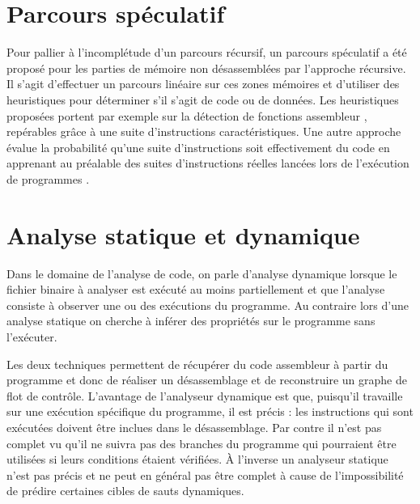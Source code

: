 \section{Parcours spéculatif}
Pour pallier à l'incomplétude d'un parcours récursif, un parcours spéculatif a été proposé pour les parties de mémoire non désassemblées par l'approche récursive. 
Il s'agit d'effectuer un parcours linéaire sur ces zones mémoires et d'utiliser des heuristiques pour déterminer s'il s'agit de code ou de données.
Les heuristiques proposées portent par exemple sur la détection de fonctions assembleur \cite{KruegelRVV04}, repérables grâce à une suite d'instructions caractéristiques. Une autre approche évalue la probabilité qu'une suite d'instructions soit effectivement du code en apprenant au préalable des suites d'instructions réelles lancées lors de l'exécution de programmes \cite{KDF09}.




\section{Analyse statique et dynamique}
Dans le domaine de l'analyse de code, on parle d'analyse dynamique lorsque le fichier binaire à analyser est exécuté au moins partiellement et que l'analyse consiste à observer une ou des exécutions du programme. Au contraire lors d'une analyse statique on cherche à inférer des propriétés sur le programme sans l'exécuter.

Les deux techniques permettent de récupérer du code assembleur à partir du programme et donc de réaliser un désassemblage et de reconstruire un graphe de flot de contrôle.
L'avantage de l'analyseur dynamique est que, puisqu'il travaille sur une exécution spécifique du programme, il est précis : les instructions qui sont exécutées doivent être inclues dans le désassemblage.
Par contre il n'est pas complet vu qu'il ne suivra pas des branches du programme qui pourraient être utilisées si leurs conditions étaient vérifiées. À l'inverse un analyseur statique n'est pas précis et ne peut en général pas être complet à cause de l'impossibilité de prédire certaines cibles de sauts dynamiques.